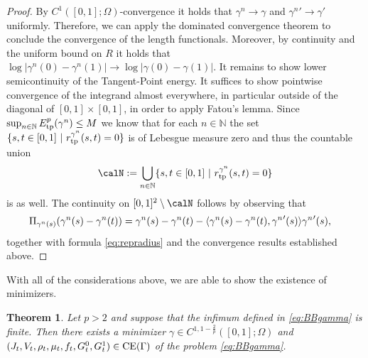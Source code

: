 \documentclass{article}
\DeclarePairedDelimiter{\skp}{\langle}{\rangle}
\newtheorem{theorem}{Theorem}[section]
\begin{document}
\begin{proof}
    By $C^{1}([0,1];\Omega)$-convergence it holds that $\gamma^n \rightarrow \gamma$ and ${\gamma^n}' \rightarrow \gamma'$ uniformly. Therefore, we can apply the dominated convergence theorem to conclude the convergence of the length functionals. Moreover, by continuity and the uniform bound on $R$ it holds that $\log{|\gamma^n(0) - \gamma^n(1)|} \to \log{|\gamma(0) - \gamma(1)|}$. 
    It remains to show lower semicontinuity of the Tangent-Point energy. 
    It suffices to show pointwise convergence of the integrand almost everywhere, in particular outside of the diagonal of $[0,1]\times[0,1]$, in order to apply Fatou's lemma. Since $\sup_{n\in \mathbb{N}}E^p_{\rm tp}(\gamma^n)\leq M$ we know that for each $n\in\mathbb{N}$ the set $\{s,t\in[0,1]\ | \ r_{\rm tp}^{\gamma^n}(s,t) = 0 \}$ is of Lebesgue measure zero and thus the countable union 
    \begin{align*}
        \calN := \bigcup\limits_{n\in\mathbb{N}} \{s,t\in[0,1]\ | \ r_{\rm tp}^{\gamma^n}(s,t) = 0 \}
    \end{align*}
    is as well. 
    The continuity on $[0,1]^2\setminus \calN$ follows by observing that
    \begin{align*}
        \Pi_{\gamma^n(s)}(\gamma^n(s) - \gamma^n(t)) &= \gamma^n(s) - \gamma^n(t) - \skp{\gamma^n(s) - \gamma^n(t), {\gamma^n}'(s)}{\gamma^n}'(s),
    \end{align*}
     together with formula \eqref{eq:repradius}  and the convergence results established above.
\end{proof}



With all of the considerations above, we are able to show the existence of minimizers. 

\begin{theorem}\label{thm:compn}
    Let $p>2$ and suppose that the infimum defined in \eqref{eq:BBgamma} is finite. Then there exists a minimizer $\gamma \in C^{1, 1 - \frac{2}{p}}([0,1];\Omega)$ and $(J_t, V_t, \rho_t, \mu_t, f_t, G^0_t, G^1_t) \in {\rm CE}(\Gamma)$ of the problem \eqref{eq:BBgamma}.
\end{theorem}
\end{document}
